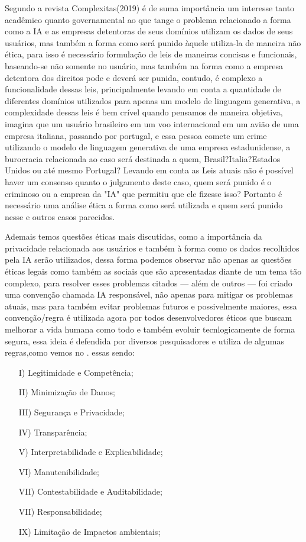 \documentclass[12pt,a4paper]{article}
\begin{document}
      Segundo a revista Complexitas(2019)\citet{complexitas6633} é de suma importância um interesse tanto acadêmico quanto governamental ao que tange o 
    problema relacionado a forma como a IA e as empresas detentoras de seus domínios utilizam os dados de seus usuários, mas também a forma como será 
    punido àquele utiliza-la de maneira não ética, para isso é necessário formulação de leis de maneiras concisas e funcionais, baseando-se não somente no
    usuário, mas também na forma como a empresa detentora dos direitos pode e deverá ser punida, contudo, é complexo a funcionalidade dessas leis,
    principalmente levando em conta a quantidade de diferentes domínios utilizados para apenas um modelo de linguagem generativa, a complexidade dessas leis
    é bem crível quando pensamos de maneira objetiva, imagina que um usuário brasileiro em um voo internacional em um avião de uma empresa italiana, 
    passando por portugal, e essa pessoa comete um crime utilizando o modelo de linguagem generativa de uma empresa estadunidense, a burocracia relacionada
    ao caso será destinada a quem, Brasil?Italia?Estados Unidos ou até mesmo Portugal? Levando em conta as Leis atuais não é possível haver um consenso
    quanto o julgamento deste caso, quem será punido é o criminoso ou a empresa da "IA" que permitiu que ele fizesse isso? Portanto é necessário uma análise
    ética a forma como será utilizada e quem será punido nesse e outros casos parecidos.

      Ademais temos questões éticas mais discutidas, como a importância da privacidade relacionada aos usuários e também à forma como os dados recolhidos
    pela IA serão utilizados, dessa forma podemos observar não apenas as questões éticas legais como também as sociais que são apresentadas diante de um tema tão complexo,
    para resolver esses problemas citados — além de outros — foi criado uma convenção chamada IA responsável, não apenas para mitigar os problemas atuais, 
    mas para também evitar problemas futuros e possivelmente maiores, essa convenção/regra é utilizada agora por todos desenvolvedores éticos que buscam melhorar
    a vida humana como todo e também evoluir tecnlogicamente de forma segura, essa ideia é defendida por diversos pesquisadores e utiliza de algumas regras,como vemos no \cite{Almeida_Nas_2024}. essas sendo:
    \begin{enumerate}
      \item[I)] Legitimidade e Competência;
      \item[II)] Minimização de Danos;
      \item[III)] Segurança e Privacidade;
      \item[IV)] Transparência;
      \item[V)] Interpretabilidade e Explicabilidade;
      \item[VI)] Manutenibilidade;
      \item[VII)] Contestabilidade e Auditabilidade;
      \item[VII)] Responsabilidade;
      \item[IX)] Limitação de Impactos ambientais;
    \end{enumerate}
\end{document}
